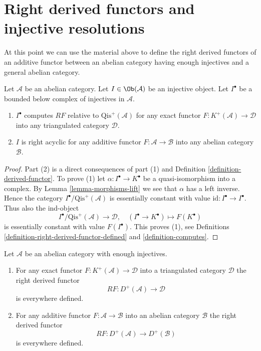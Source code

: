 \section{Right derived functors and injective resolutions}
\label{section-right-derived-functor}

\noindent
At this point we can use the material above to define the right derived
functors of an additive functor between an abelian category having
enough injectives and a general abelian category.

\begin{lemma}
\label{lemma-injective-acyclic}
Let $\mathcal{A}$ be an abelian category.
Let $I \in \Ob(\mathcal{A})$ be an injective object.
Let $I^\bullet$ be a bounded below complex of injectives in $\mathcal{A}$.
\begin{enumerate}
\item $I^\bullet$ computes $RF$ relative to $\text{Qis}^{+}(\mathcal{A})$
for any exact functor $F : K^{+}(\mathcal{A}) \to \mathcal{D}$
into any triangulated category $\mathcal{D}$.
\item $I$ is right acyclic for any additive functor
$F : \mathcal{A} \to \mathcal{B}$ into any abelian category $\mathcal{B}$.
\end{enumerate}
\end{lemma}

\begin{proof}
Part (2) is a direct consequences of part (1) and
Definition \ref{definition-derived-functor}.
To prove (1) let $\alpha : I^\bullet \to K^\bullet$ be a quasi-isomorphism
into a complex. By
Lemma \ref{lemma-morphisms-lift}
we see that $\alpha$ has a left inverse. Hence the category
$I^\bullet/\text{Qis}^{+}(\mathcal{A})$ is essentially constant with value
$\text{id} : I^\bullet \to I^\bullet$. Thus also the ind-object
$$
I^\bullet/\text{Qis}^{+}(\mathcal{A}) \longrightarrow \mathcal{D}, \quad
(I^\bullet \to K^\bullet) \longmapsto F(K^\bullet)
$$
is essentially constant with value $F(I^\bullet)$. This proves (1), see
Definitions \ref{definition-right-derived-functor-defined} and
\ref{definition-computes}.
\end{proof}

\begin{lemma}
\label{lemma-enough-injectives-right-derived}
Let $\mathcal{A}$ be an abelian category with enough injectives.
\begin{enumerate}
\item For any exact functor $F : K^{+}(\mathcal{A}) \to \mathcal{D}$
into a triangulated category $\mathcal{D}$ the right derived
functor
$$
RF : D^{+}(\mathcal{A}) \longrightarrow \mathcal{D}
$$
is everywhere defined.
\item For any additive functor $F : \mathcal{A} \to \mathcal{B}$ into an
abelian category $\mathcal{B}$ the right derived functor
$$
RF : D^{+}(\mathcal{A}) \longrightarrow D^{+}(\mathcal{B})
$$
is everywhere defined.
\end{enumerate}
\end{lemma}

